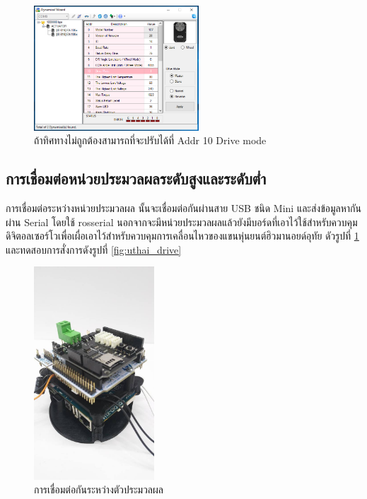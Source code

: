 \begin{figure}[!ht]
    \centering
    \includegraphics[width=0.55\textwidth]{chapter3/images/roboplus/roboplus7.PNG}
    \caption*{ถ้าทิศทางไม่ถูกต้องสามารถที่จะปรับได้ที่ Addr 10 Drive mode}
\end{figure}

\clearpage
\subsection{การเชื่อมต่อหน่วยประมวลผลระดับสูงและระดับต่ำ}
การเชื่อมต่อระหว่างหน่วยประมวลผล นั้นจะเชื่อมต่อกันผ่านสาย USB ชนิด Mini
และส่งข้อมูลหากันผ่าน Serial โดยใช้ rosserial นอกจากจะมีหน่วยประมวลผลแล้วยังมีบอร์ดที่เอาไว้ใช้สำหรับควบคุม
ดิจิตอลเซอร์โวเพื่อเผื่อเอาไว้สำหรับควบคุมการเคลื่อนไหวของแขนหุ่นยนต์ฮิวมานอยด์อุทัย
ดัวรูปที่ \ref{fig:uthai_controller} และทดสอบการสั่งการดังรูปที่ \ref{fig:uthai_drive} 

\begin{figure}[!ht]
    \centering
    \includegraphics[width=0.4\textwidth]{chapter3/images/uthai_controller.jpg}
    \caption{การเชื่อมต่อกันระหว่างตัวประมวลผล}
    \label{fig:uthai_controller}
\end{figure}

